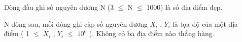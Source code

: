 Dòng đầu ghi số nguyên dương N (3  $\le$  N  $\le$  1000) là số địa điểm đẹp.  

   N dòng sau, mỗi dòng ghi cặp số nguyên dương $X_{i}$   , $Y_{i}$   là tọa độ của một địa điểm ( 1  $\le$  $X_{i}$   , $Y_{i}$    $\le$  $10^{6}$   ). Không có ba địa điểm nào thẳng hàng.